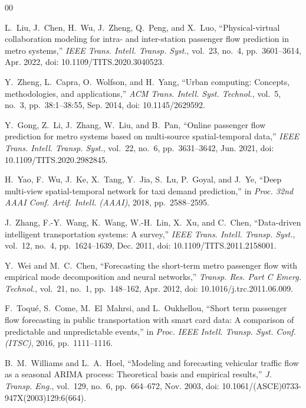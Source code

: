 \documentclass[conference]{IEEEtran}
\begin{document}
\begin{thebibliography}{00}

L.~Liu, J.~Chen, H.~Wu, J.~Zheng, Q.~Peng, and X.~Luo, ``Physical-virtual collaboration modeling for intra- and inter-station passenger flow prediction in metro systems,'' \emph{IEEE Trans. Intell. Transp. Syst.}, vol.~23, no.~4, pp.~3601--3614, Apr. 2022, doi: 10.1109/TITS.2020.3040523.

Y.~Zheng, L.~Capra, O.~Wolfson, and H.~Yang, ``Urban computing: Concepts, methodologies, and applications,'' \emph{ACM Trans. Intell. Syst. Technol.}, vol.~5, no.~3, pp.~38:1--38:55, Sep. 2014, doi: 10.1145/2629592.

Y.~Gong, Z.~Li, J.~Zhang, W.~Liu, and B.~Pan, ``Online passenger flow prediction for metro systems based on multi-source spatial-temporal data,'' \emph{IEEE Trans. Intell. Transp. Syst.}, vol.~22, no.~6, pp.~3631--3642, Jun. 2021, doi: 10.1109/TITS.2020.2982845.

H.~Yao, F.~Wu, J.~Ke, X.~Tang, Y.~Jia, S.~Lu, P.~Goyal, and J.~Ye, ``Deep multi-view spatial-temporal network for taxi demand prediction,'' in \emph{Proc. 32nd AAAI Conf. Artif. Intell. (AAAI)}, 2018, pp.~2588--2595.

J.~Zhang, F.-Y.~Wang, K.~Wang, W.-H.~Lin, X.~Xu, and C.~Chen, ``Data-driven intelligent transportation systems: A survey,'' \emph{IEEE Trans. Intell. Transp. Syst.}, vol.~12, no.~4, pp.~1624--1639, Dec. 2011, doi: 10.1109/TITS.2011.2158001.

Y.~Wei and M.~C.~Chen, ``Forecasting the short-term metro passenger flow with empirical mode decomposition and neural networks,'' \emph{Transp. Res. Part C Emerg. Technol.}, vol.~21, no.~1, pp.~148--162, Apr. 2012, doi: 10.1016/j.trc.2011.06.009.

F.~Toqu{\'e}, S.~Come, M.~El~Mahrsi, and L.~Oukhellou, ``Short term passenger flow forecasting in public transportation with smart card data: A comparison of predictable and unpredictable events,'' in \emph{Proc. IEEE Intell. Transp. Syst. Conf. (ITSC)}, 2016, pp.~1111--1116.

B.~M.~Williams and L.~A.~Hoel, ``Modeling and forecasting vehicular traffic flow as a seasonal ARIMA process: Theoretical basis and empirical results,'' \emph{J. Transp. Eng.}, vol.~129, no.~6, pp.~664--672, Nov. 2003, doi: 10.1061/(ASCE)0733-947X(2003)129:6(664).


\end{thebibliography}
\end{document}

